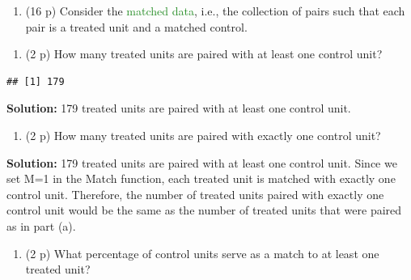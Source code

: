 \documentclass[
]{article}
\newenvironment{Shaded}{\begin{snugshade}}{\end{snugshade}}
\newcommand{\DecValTok}[1]{\textcolor[rgb]{0.00,0.00,0.81}{#1}}
\newcommand{\FunctionTok}[1]{\textcolor[rgb]{0.13,0.29,0.53}{\textbf{#1}}}
\newcommand{\NormalTok}[1]{#1}
\newcommand{\OtherTok}[1]{\textcolor[rgb]{0.56,0.35,0.01}{#1}}
\newcommand{\SpecialCharTok}[1]{\textcolor[rgb]{0.81,0.36,0.00}{\textbf{#1}}}
\providecommand{\tightlist}{%
  \setlength{\itemsep}{0pt}\setlength{\parskip}{0pt}}
\begin{document}
\begin{enumerate}
\def\labelenumi{\arabic{enumi}.}
\setcounter{enumi}{6}
\tightlist
\item
  (16 p) Consider the \textcolor{ForestGreen}{matched data}, i.e., the
  collection of pairs such that each pair is a treated unit and a
  matched control.
\end{enumerate}

\begin{enumerate}
\def\labelenumi{\alph{enumi}.}
\tightlist
\item
  (2 p) How many treated units are paired with at least one control
  unit?
\end{enumerate}

\begin{Shaded}
\end{Shaded}

\begin{verbatim}
## [1] 179
\end{verbatim}

\textbf{Solution:} 179 treated units are paired with at least one
control unit.

\begin{enumerate}
\def\labelenumi{\alph{enumi}.}
\setcounter{enumi}{1}
\tightlist
\item
  (2 p) How many treated units are paired with exactly one control unit?
\end{enumerate}

\textbf{Solution:} 179 treated units are paired with at least one
control unit. Since we set M=1 in the Match function, each treated unit
is matched with exactly one control unit. Therefore, the number of
treated units paired with exactly one control unit would be the same as
the number of treated units that were paired as in part (a).

\begin{enumerate}
\def\labelenumi{\alph{enumi}.}
\setcounter{enumi}{2}
\tightlist
\item
  (2 p) What percentage of control units serve as a match to at least
  one treated unit?
\end{enumerate}

\begin{Shaded}
\end{Shaded}
\end{document}
